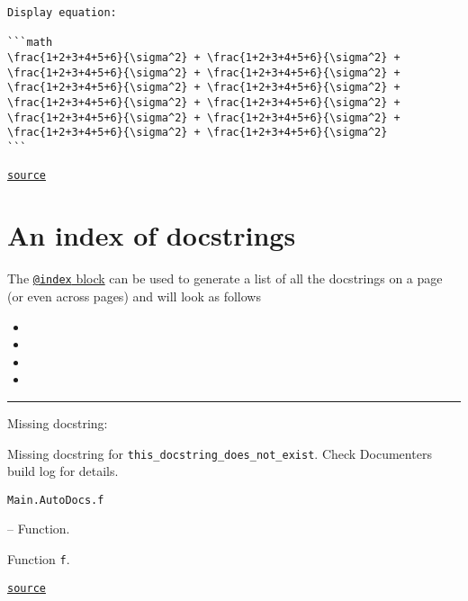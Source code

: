 \begin{adjustwidth}{2em}{0pt}
\begin{lstlisting}
Display equation:

```math
\frac{1+2+3+4+5+6}{\sigma^2} + \frac{1+2+3+4+5+6}{\sigma^2} + \frac{1+2+3+4+5+6}{\sigma^2} + \frac{1+2+3+4+5+6}{\sigma^2} + \frac{1+2+3+4+5+6}{\sigma^2} + \frac{1+2+3+4+5+6}{\sigma^2} + \frac{1+2+3+4+5+6}{\sigma^2} + \frac{1+2+3+4+5+6}{\sigma^2} + \frac{1+2+3+4+5+6}{\sigma^2} + \frac{1+2+3+4+5+6}{\sigma^2} + \frac{1+2+3+4+5+6}{\sigma^2} + \frac{1+2+3+4+5+6}{\sigma^2}
```
\end{lstlisting}



\href{https://example.org/Repository.jl/blob/test/examples/make.jl#L41-71}{\texttt{source}}


\end{adjustwidth}

\section{An index of docstrings}



\label{4901604269105032859}{}


The \href{@ref}{\texttt{@index} block} can be used to generate a list of all the docstrings on a page (or even across pages) and will look as follows


\begin{itemize}
\item {}
\item {}
\item {}
\item {}
\end{itemize}


{\rule{\textwidth}{1pt}}


Missing docstring:



\begin{tcolorbox}[colback=admonition-warning!5!white,colframe=admonition-warning!75!black,title=\textbf{Missing docstring.}]
Missing docstring for \texttt{this\_docstring\_does\_not\_exist}. Check Documenter{\textquotesingle}s build log for details.

\end{tcolorbox}

\hypertarget{5308965026370084775}{\texttt{Main.AutoDocs.f}}  -- {Function.}

\begin{adjustwidth}{2em}{0pt}

Function \texttt{f}.



\href{https://example.org/Repository.jl/blob/test/examples/make.jl#L85-85}{\texttt{source}}


\end{adjustwidth}


